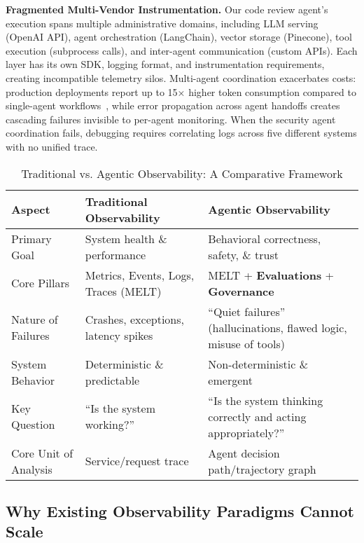 \documentclass[sigplan,screen,9pt]{acmart}
\begin{document}
\textbf{Fragmented Multi-Vendor Instrumentation.} Our code review agent's execution spans multiple administrative domains, including LLM serving (OpenAI API), agent orchestration (LangChain), vector storage (Pinecone), tool execution (subprocess calls), and inter-agent communication (custom APIs). Each layer has its own SDK, logging format, and instrumentation requirements, creating incompatible telemetry silos. Multi-agent coordination exacerbates costs: production deployments report up to 15× higher token consumption compared to single-agent workflows~\cite{anthropic-multiagent}, while error propagation across agent handoffs creates cascading failures invisible to per-agent monitoring. When the security agent coordination fails, debugging requires correlating logs across five different systems with no unified trace.

\begin{table*}[t]
  \caption{Traditional vs. Agentic Observability: A Comparative Framework}
  \label{tab:diff}
  \centering
  \begin{tabular}{@{}p{3cm}p{5.5cm}p{5.5cm}@{}}
    \toprule
    \textbf{Aspect} &
    \textbf{Traditional Observability} &
    \textbf{Agentic Observability} \\
    \midrule
    Primary Goal &
    System health \& performance &
    Behavioral correctness, safety, \& trust \\
    Core Pillars &
    Metrics, Events, Logs, Traces (MELT)~\cite{li2022observability} &
    MELT + \textbf{Evaluations} + \textbf{Governance} \\
    Nature of Failures &
    Crashes, exceptions, latency spikes &
    ``Quiet failures'' (hallucinations, flawed logic, misuse of tools) \\
    System Behavior &
    Deterministic \& predictable &
    Non-deterministic \& emergent \\
    Key Question &
    ``Is the system working?'' &
    ``Is the system thinking correctly and acting appropriately?'' \\
    Core Unit of Analysis &
    Service/request trace &
    Agent decision path/trajectory graph \\
    \bottomrule
  \end{tabular}
\end{table*}

\subsection{Why Existing Observability Paradigms Cannot Scale}
\end{document}
